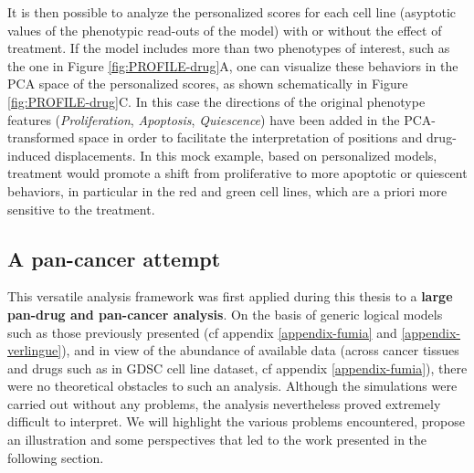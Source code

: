 \documentclass[a4paper,12pt,twoside,onecolumn,openright,final,oldfontcommands]{memoir}
\begin{document}
It is then possible to analyze the personalized scores for each cell
line (asyptotic values of the phenotypic read-outs of the model) with or
without the effect of treatment. If the model includes more than two
phenotypes of interest, such as the one in Figure
\ref{fig:PROFILE-drug}A, one can visualize these behaviors in the PCA
space of the personalized scores, as shown schematically in Figure
\ref{fig:PROFILE-drug}C. In this case the directions of the original
phenotype features (\emph{Proliferation}, \emph{Apoptosis},
\emph{Quiescence}) have been added in the PCA-transformed space in order
to facilitate the interpretation of positions and drug-induced
displacements. In this mock example, based on personalized models,
treatment would promote a shift from proliferative to more apoptotic or
quiescent behaviors, in particular in the red and green cell lines,
which are a priori more sensitive to the treatment.

\subsection{A pan-cancer attempt}\label{a-pan-cancer-attempt}

This versatile analysis framework was first applied during this thesis
to a \textbf{large pan-drug and pan-cancer analysis}. On the basis of
generic logical models such as those previously presented (cf appendix
\ref{appendix-fumia} and \ref{appendix-verlingue}), and in view of the
abundance of available data (across cancer tissues and drugs such as in
GDSC cell line dataset, cf appendix \ref{appendix-fumia}), there were no
theoretical obstacles to such an analysis. Although the simulations were
carried out without any problems, the analysis nevertheless proved
extremely difficult to interpret. We will highlight the various problems
encountered, propose an illustration and some perspectives that led to
the work presented in the following section.
\end{document}
